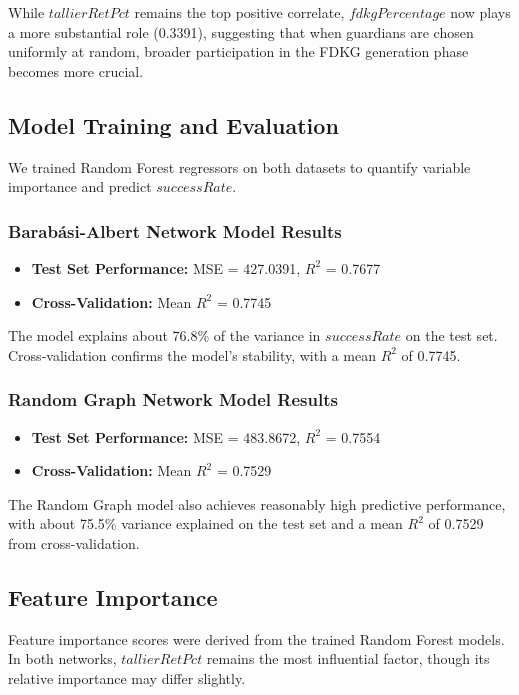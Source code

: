 \documentclass[runningheads]{llncs}
\begin{document}
While $tallierRetPct$ remains the top positive correlate, $fdkgPercentage$ now plays a more substantial role (0.3391), suggesting that when guardians are chosen uniformly at random, broader participation in the FDKG generation phase becomes more crucial.

\subsection{Model Training and Evaluation}

We trained Random Forest regressors on both datasets to quantify variable importance and predict $successRate$.

\subsubsection{Barabási-Albert Network Model Results}

\begin{itemize}
    \item \textbf{Test Set Performance:} MSE = 427.0391, $R^2$ = 0.7677
    \item \textbf{Cross-Validation:} Mean $R^2$ = 0.7745
\end{itemize}

\noindent The model explains about 76.8\% of the variance in $successRate$ on the test set. Cross-validation confirms the model’s stability, with a mean $R^2$ of 0.7745.

\subsubsection{Random Graph Network Model Results}

\begin{itemize}
    \item \textbf{Test Set Performance:} MSE = 483.8672, $R^2$ = 0.7554
    \item \textbf{Cross-Validation:} Mean $R^2$ = 0.7529
\end{itemize}

\noindent The Random Graph model also achieves reasonably high predictive performance, with about 75.5\% variance explained on the test set and a mean $R^2$ of 0.7529 from cross-validation.

\subsection{Feature Importance}

Feature importance scores were derived from the trained Random Forest models. In both networks, $tallierRetPct$ remains the most influential factor, though its relative importance may differ slightly.
\end{document}
